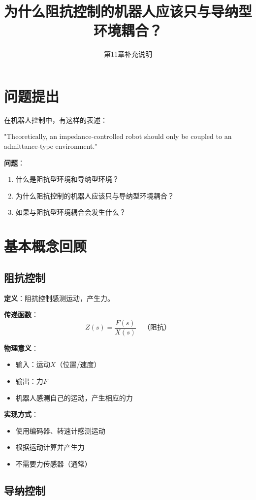 \documentclass[12pt,a4paper]{article}
\title{为什么阻抗控制的机器人应该只与导纳型环境耦合？}
\author{第11章补充说明}
\date{}
\begin{document}
\maketitle

\section{问题提出}

在机器人控制中，有这样的表述：

"Theoretically, an impedance-controlled robot should only be coupled to an admittance-type environment."

\textbf{问题}：
\begin{enumerate}
\item 什么是阻抗型环境和导纳型环境？
\item 为什么阻抗控制的机器人应该只与导纳型环境耦合？
\item 如果与阻抗型环境耦合会发生什么？
\end{enumerate}

\section{基本概念回顾}

\subsection{阻抗控制}

\textbf{定义}：阻抗控制感测运动，产生力。

\textbf{传递函数}：
\begin{equation}
Z(s) = \frac{F(s)}{X(s)} \quad \text{（阻抗）}
\end{equation}

\textbf{物理意义}：
\begin{itemize}
\item 输入：运动$X$（位置/速度）
\item 输出：力$F$
\item 机器人感测自己的运动，产生相应的力
\end{itemize}

\textbf{实现方式}：
\begin{itemize}
\item 使用编码器、转速计感测运动
\item 根据运动计算并产生力
\item 不需要力传感器（通常）
\end{itemize}

\subsection{导纳控制}
\end{document}
